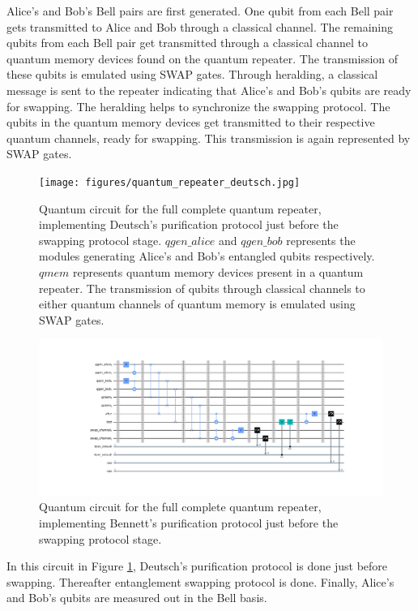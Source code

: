\documentclass[11pt]{article}
\begin{document}
Alice's and Bob's Bell pairs are first generated. One qubit from each Bell pair gets transmitted to Alice and Bob through a classical channel. The remaining qubits from each Bell pair get transmitted through a classical channel to quantum memory devices found on the quantum repeater. The transmission of these qubits is emulated using SWAP gates. Through heralding, a classical message is sent to the repeater indicating that Alice's and Bob's qubits are ready for swapping. The heralding helps to synchronize the swapping protocol. The qubits in the quantum memory devices get transmitted to their respective quantum channels, ready for swapping. This transmission is again represented by SWAP gates.
\begin{figure}[ht]
    \centering
    \texttt{[image: figures/quantum\_repeater\_deutsch.jpg]}
    \caption[Complete quantum repeater using Deutsch's purification protocol]{Quantum circuit for the full complete quantum repeater, implementing Deutsch's purification protocol just before the swapping protocol stage. $qgen\_alice$ and $qgen\_bob$ represents the modules generating Alice's and Bob's entangled qubits respectively. $qmem$ represents quantum memory devices present in a quantum repeater. The transmission of qubits through classical channels to either quantum channels of quantum memory is emulated using SWAP gates.}
    \label{fig:quantum_repeater_deutsch}
\end{figure}
\begin{figure}[ht]
    \centering
    \includegraphics[width=\textwidth]{figures/quantum_repeater_bennett.jpg}
    \caption[Complete quantum repeater using Bennett's purification protocol]{Quantum circuit for the full complete quantum repeater, implementing Bennett's purification protocol just before the swapping protocol stage.}
    \label{fig:quantum_repeater_bennett}
\end{figure}
In this circuit in Figure \ref{fig:quantum_repeater_deutsch}, Deutsch's purification protocol is done just before swapping. Thereafter entanglement swapping protocol is done. Finally, Alice's and Bob's qubits are measured out in the Bell basis.
\end{document}
